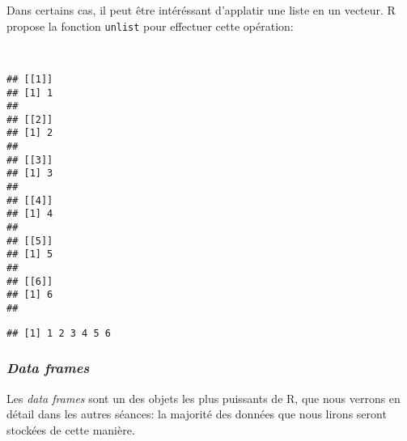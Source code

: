 Dans certains cas, il peut être intéréssant d'applatir une liste en un vecteur.
R propose la fonction \texttt{unlist} pour effectuer cette opération:

\begin{knitrout}
\color{fgcolor}\begin{kframe}
\begin{flushleft}
\ttfamily\noindent
{}\hlassignement{\usebox{\hlnormalsizeboxlessthan}-}{\ }\hlkeyword{(}\hlkeyword{,}{\ }\hlkeyword{,}{\ }\hlkeyword{,}{\ }\hlkeyword{,}{\ }\hlkeyword{,}{\ }\hlkeyword{)}\hspace*{\fill}\\
\hlstd{}\mbox{}
\normalfont
\end{flushleft}
\begin{verbatim}
## [[1]]
## [1] 1
## 
## [[2]]
## [1] 2
## 
## [[3]]
## [1] 3
## 
## [[4]]
## [1] 4
## 
## [[5]]
## [1] 5
## 
## [[6]]
## [1] 6
## 
\end{verbatim}
\begin{flushleft}
\ttfamily\noindent
{}\hlkeyword{(}\hlkeyword{)}\mbox{}
\normalfont
\end{flushleft}
\begin{verbatim}
## [1] 1 2 3 4 5 6
\end{verbatim}
\end{kframe}
\end{knitrout}


\subsubsection{\emph{Data frames}}

Les \emph{data frames} sont un des objets les plus puissants de R, que nous verrons en détail dans les autres séances: la majorité des données que nous lirons seront stockées de cette manière.
